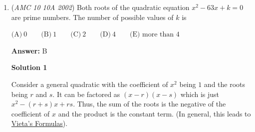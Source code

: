 \begin{enumerate}
 



\textbf{Solution 2}

By \href{https://artofproblemsolving.com/wiki/index.php?title=Heron\%27s\_formula}{Heron's formula}, the area is $150$, hence the shortest altitude's length is $2\cdot\frac{150}{25}=\boxed{12\Rightarrow \textbf{(B)}}$.

 



\textbf{Solution 3 (similarity rule)}

The sides are in the ratio of $3-4-5$, and are therefore a Pythagorean Triple and a part of a right triangle.We know two altitudes, the legs $15$ and $20$. All that is left is to check the altitude from the right angle vertex to the hypotenuse. There is a rule that states that the three triangles formed when the altitude is dropped (the big triangle and two smaller ones it gets split into) are similar! We take the triangle with hypotenuse $20$. The ratio of sides between that triangle and the bigger one is $4:5$. Since the side of length $15$ in the big triangle corresponds with our altitude, we take $15\cdot\frac{4}{5}$ to get our answer ${12}$ or $\boxed{\textbf{(B)}\ 12}$.

 



\textbf{Solution 4 (fast calculation)}

The triangle forms a $3-4-5$ right triangle, so we can first draw a triangle with legs $3$ and $4$ and hypotenuse $5$. The two altitudes $3$ and $4$ are known, and the area is $6$; therefore $5x/2 = 6$, and $x=12/5$, which is clearly less than $3$ or $4$. Now scale the triangle back up by multiplying every dimension by $5$. The smallest altitude is then $12/5 * 5$ = ${12}$ or $\boxed{\textbf{(B)}\ 12}$



	\item (\textit{AMC 10 10A 2002}) Both roots of the quadratic equation $x^2 - 63x + k = 0$ are prime numbers. The number of possible values of $k$ is 


 $\text{(A)}\ 0 \qquad \text{(B)}\ 1 \qquad \text{(C)}\ 2 \qquad \text{(D)}\ 4 \qquad \text{(E) more than 4}$

 \textbf{Answer: }B



\textbf{Solution 1}

Consider a general quadratic with the coefficient of $x^2$ being $1$ and the roots being $r$ and $s$. It can be factored as $(x-r)(x-s)$ which is just $x^2-(r+s)x+rs$. Thus, the sum of the roots is the negative of the coefficient of $x$ and the product is the constant term. (In general, this leads to \href{https://artofproblemsolving.com/wiki/index.php?title=Vieta\%27s\_Formulas}{Vieta's Formulas}).


\end{enumerate}
